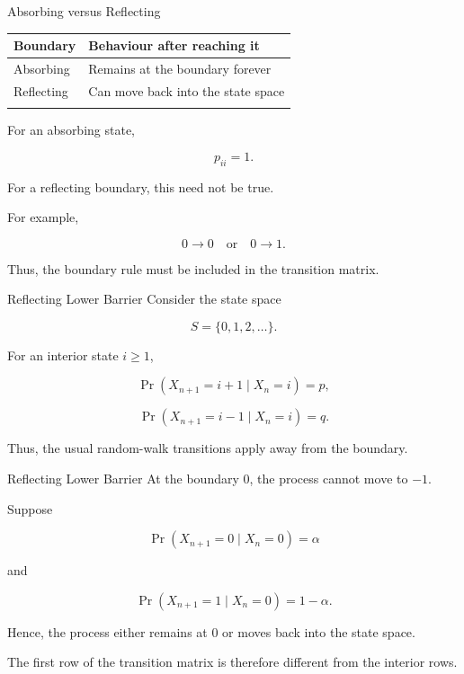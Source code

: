 \documentclass[
  ignorenonframetext,
  aspectratio=169,
]{beamer}
\newcounter{none} %
\begin{document}
\begin{frame}{Absorbing versus Reflecting}
\protect{}\label{absorbing-versus-reflecting}
{\def\LTcaptype{none} %
\begin{longtable}[]{@{}ll@{}}
\toprule\noalign{}
Boundary & Behaviour after reaching it \\
\midrule\noalign{}
\endhead
Absorbing & Remains at the boundary forever \\
Reflecting & Can move back into the state space \\
\bottomrule\noalign{}
\end{longtable}
}

For an absorbing state,

\[
p_{ii}=1.
\]

For a reflecting boundary, this need not be true.

For example,

\[
0\longrightarrow0
\quad\text{or}\quad
0\longrightarrow1.
\]

Thus, the boundary rule must be included in the transition matrix.
\end{frame}

\begin{frame}{Reflecting Lower Barrier}
\protect{}\label{reflecting-lower-barrier}
Consider the state space

\[
S=\{0,1,2,\ldots\}.
\]

For an interior state \(i\geq1\),

\[
\Pr(X_{n+1}=i+1\mid X_n=i)=p,
\]

\[
\Pr(X_{n+1}=i-1\mid X_n=i)=q.
\]

Thus, the usual random-walk transitions apply away from the boundary.
\end{frame}

\begin{frame}{Reflecting Lower Barrier}
\protect{}\label{reflecting-lower-barrier-1}
At the boundary \(0\), the process cannot move to \(-1\).

Suppose

\[
\Pr(X_{n+1}=0\mid X_n=0)=\alpha
\]

and

\[
\Pr(X_{n+1}=1\mid X_n=0)=1-\alpha.
\]

Hence, the process either remains at \(0\) or moves back into the state
space.

The first row of the transition matrix is therefore different from the
interior rows.
\end{frame}
\end{document}
